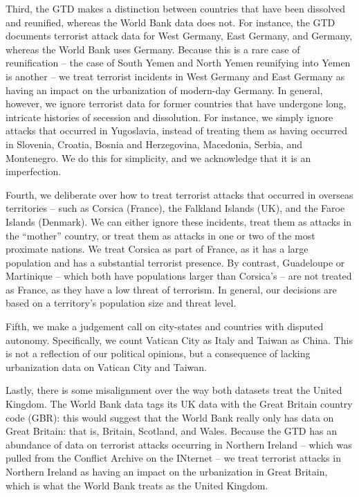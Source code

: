\documentclass[preprint,2p,12pt]{elsarticle}
\begin{document}
Third, the GTD makes a distinction between countries that have been dissolved and reunified, whereas the World Bank data does not.
For instance, the GTD documents terrorist attack data for West Germany, East Germany, and Germany, whereas the World Bank uses Germany.
Because this is a rare case of reunification -- the case of South Yemen and North Yemen reunifying into Yemen is another -- we treat terrorist incidents in West Germany and East Germany as having an impact on the urbanization of modern-day Germany.
In general, however, we ignore terrorist data for former countries that have undergone long, intricate histories of secession and dissolution.
For instance, we simply ignore attacks that occurred in Yugoslavia, instead of treating them as having occurred in Slovenia, Croatia, Bosnia and Herzegovina, Macedonia, Serbia, and Montenegro. We do this for simplicity, and we acknowledge that it is an imperfection.

Fourth, we deliberate over how to treat terrorist attacks that occurred in overseas territories -- such as Corsica (France), the Falkland Islands (UK), and the Faroe Islands (Denmark).
We can either ignore these incidents, treat them as attacks in the ``mother'' country, or treat them as attacks in one or two of the most proximate nations.
We treat Corsica as part of France, as it has a large population and has a substantial terrorist presence.
By contrast, Guadeloupe or Martinique -- which both have populations larger than Corsica's -- are not treated as France, as they have a low threat of terrorism.
In general, our decisions are based on a territory's population size and threat level.

Fifth, we make a judgement call on city-states and countries with disputed autonomy.
Specifically, we count Vatican City as Italy and Taiwan as China.
This is not a reflection of our political opinions, but a consequence of lacking urbanization data on Vatican City and Taiwan.

Lastly, there is some misalignment over the way both datasets treat the United Kingdom.
The World Bank data tags its UK data with the Great Britain country code (GBR):
this would suggest that the World Bank really only has data on Great Britain: that is, Britain, Scotland, and Wales.
Because the GTD has an abundance of data on terrorist attacks occurring in Northern Ireland -- which was pulled from the Conflict Archive on the INternet -- we treat terrorist attacks in Northern Ireland as having an impact on the urbanization in Great Britain, which is what the World Bank treats as the United Kingdom.
\end{document}
